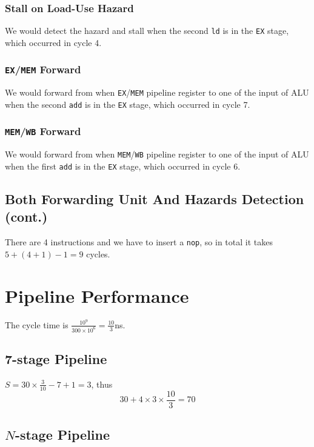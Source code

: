 \documentclass[12pt, a4paper]{article}
\begin{document}
\subsubsection{Stall on Load-Use Hazard}

We would detect the hazard and stall when the second \texttt{ld} is in the \texttt{EX} stage, which occurred in cycle 4.

\subsubsection{\texttt{EX}/\texttt{MEM} Forward}

We would forward from when \texttt{EX}/\texttt{MEM} pipeline register to one of the input of ALU when the second \texttt{add} is in the \texttt{EX} stage, which occurred in cycle 7.

\subsubsection{\texttt{MEM}/\texttt{WB} Forward}

We would forward from when \texttt{MEM}/\texttt{WB} pipeline register to one of the input of ALU when the first \texttt{add} is in the \texttt{EX} stage, which occurred in cycle 6.

\subsection{Both Forwarding Unit And Hazards Detection (cont.)}

There are 4 instructions and we have to insert a \texttt{nop}, so in total it takes $5+(4+1)-1=9$ cycles.

\section{Pipeline Performance}

The cycle time is $\frac{10^9}{300\times10^6}=\frac{10}{3}$ns.

\subsection{7-stage Pipeline}

$S=30\times\frac{3}{10}-7+1=3$, thus
$$30+4\times3\times\frac{10}{3}=70$$

\subsection{$N$-stage Pipeline}
\end{document}
